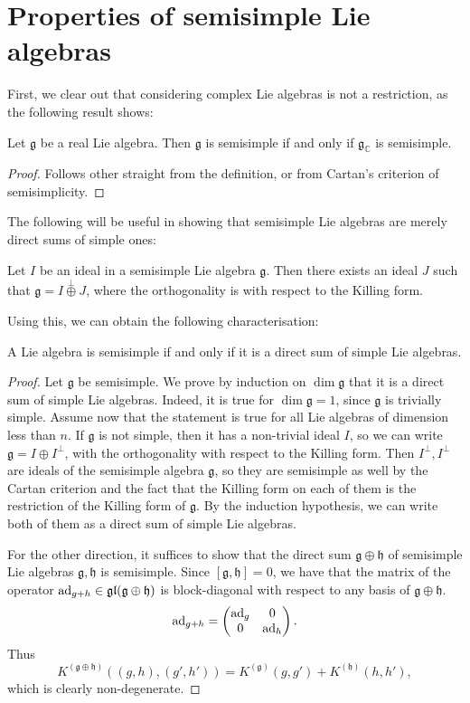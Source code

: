 \documentclass{report}
\begin{document}
\section{Properties of semisimple Lie algebras}
First, we clear out that considering complex Lie algebras is not a restriction, as the following result shows:
\begin{proposition}
    Let $\mathfrak g$ be a real Lie algebra.
    Then $\mathfrak g$ is semisimple if and only if $\mathfrak g_{\mathbb C}$ is semisimple.
\end{proposition}
\begin{proof}
    Follows other straight from the definition, or from Cartan's criterion of semisimplicity.
\end{proof}
The following will be useful in showing that semisimple Lie algebras are merely direct sums of simple ones:
\begin{proposition}
    Let $I$ be an ideal in a semisimple Lie algebra $\mathfrak g$.
    Then there exists an ideal $J$ such that $\mathfrak g = I \overset{\perp}{\oplus} J$, where the orthogonality is with respect to the Killing form.
\end{proposition}
Using this, we can obtain the following characterisation:
\begin{corollary}
    A Lie algebra is semisimple if and only if it is a direct sum of simple Lie algebras.
\end{corollary}
\begin{proof}
    Let $\mathfrak g$ be semisimple.
    We prove by induction on $\dim \mathfrak g$ that it is a direct sum of simple Lie algebras.
    Indeed, it is true for $\dim \mathfrak g = 1$, since $\mathfrak g$ is trivially simple.
    Assume now that the statement is true for all Lie algebras of dimension less than $n$.
    If $\mathfrak g$ is not simple, then it has a non-trivial ideal $I$, so we can write $\mathfrak g = I \oplus I^\perp$, with the orthogonality with respect to the Killing form.
    Then $I^\perp, I^\perp$ are ideals of the semisimple algebra $\mathfrak g$, so they are semisimple as well by the Cartan criterion and the fact that the Killing form on each of them is the restriction of the Killing form of $\mathfrak g$.
    By the induction hypothesis, we can write both of them as a direct sum of simple Lie algebras.
    
    For the other direction, it suffices to show that the direct sum $\mathfrak g \oplus \mathfrak h$ of semisimple Lie algebras $\mathfrak{g}, \mathfrak h$ is semisimple.
    Since $[\mathfrak g, \mathfrak h] = 0$, we have that the matrix of the operator $\operatorname{ad}_{g + h} \in \operatorname{{\mathfrak{gl}}}(\mathfrak g \oplus \mathfrak h)$ is block-diagonal with respect to any basis of $\mathfrak g \oplus \mathfrak h$.
    \[
    \operatorname{ad}_{g+h} = \begin{pmatrix}
        \operatorname{ad}_g & 0\\
        0 & \operatorname{ad}_h
    \end{pmatrix}.
    \]
    Thus
    \[
    K^{(\mathfrak g \oplus \mathfrak h)}((g,h), (g',h')) = K^{(\mathfrak g)}(g,g') + K^{(\mathfrak h)}(h,h'),
    \]
    which is clearly non-degenerate.
\end{proof}
\end{document}
